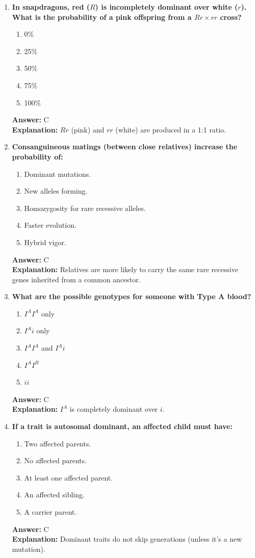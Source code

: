 \documentclass[11pt, a4paper]{article}
\begin{document}
\begin{enumerate}[leftmargin=*, label=\arabic*.]
\item \textbf{In snapdragons, red ($R$) is incompletely dominant over white ($r$). What is the probability of a pink offspring from a $Rr \times rr$ cross?}
\begin{enumerate}[label=\Alph*.]
\item 0\%
\item 25\%
\item 50\%
\item 75\%
\item 100\%
\end{enumerate}
\textbf{Answer:} C \\
\textbf{Explanation:} $Rr$ (pink) and $rr$ (white) are produced in a 1:1 ratio.

\item \textbf{Consanguineous matings (between close relatives) increase the probability of:}
\begin{enumerate}[label=\Alph*.]
\item Dominant mutations.
\item New alleles forming.
\item Homozygosity for rare recessive alleles.
\item Faster evolution.
\item Hybrid vigor.
\end{enumerate}
\textbf{Answer:} C \\
\textbf{Explanation:} Relatives are more likely to carry the same rare recessive genes inherited from a common ancestor.

\item \textbf{What are the possible genotypes for someone with Type A blood?}
\begin{enumerate}[label=\Alph*.]
\item $I^A I^A$ only
\item $I^A i$ only
\item $I^A I^A$ and $I^A i$
\item $I^A I^B$
\item $ii$
\end{enumerate}
\textbf{Answer:} C \\
\textbf{Explanation:} $I^A$ is completely dominant over $i$.

\item \textbf{If a trait is autosomal dominant, an affected child must have:}
\begin{enumerate}[label=\Alph*.]
\item Two affected parents.
\item No affected parents.
\item At least one affected parent.
\item An affected sibling.
\item A carrier parent.
\end{enumerate}
\textbf{Answer:} C \\
\textbf{Explanation:} Dominant traits do not skip generations (unless it's a new mutation).


\end{enumerate}
\end{document}
